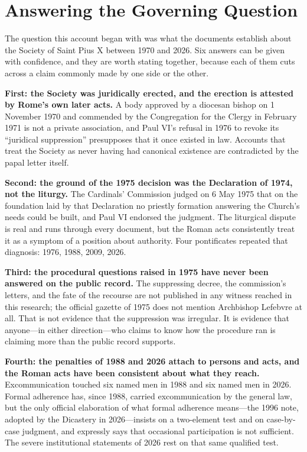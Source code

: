 \section{Answering the Governing Question}

The question this account began with was what the documents establish
about the Society of Saint Pius X between 1970 and 2026. Six answers can
be given with confidence, and they are worth stating together, because
each of them cuts across a claim commonly made by one side or the other.

\textbf{First: the Society was juridically erected, and the erection is
attested by Rome's own later acts.} A body approved by a diocesan bishop
on 1 November 1970 and commended by the Congregation for the Clergy in
February 1971 is not a private association, and Paul VI's refusal in 1976
to revoke its ``juridical suppression'' presupposes that it once existed
in law. Accounts that treat the Society as never having had canonical
existence are contradicted by the papal letter itself.

\textbf{Second: the ground of the 1975 decision was the Declaration of
1974, not the liturgy.} The Cardinals' Commission judged on 6 May 1975
that on the foundation laid by that Declaration no priestly formation
answering the Church's needs could be built, and Paul VI endorsed the
judgment. The liturgical dispute is real and runs through every
document, but the Roman acts consistently treat it as a symptom of a
position about authority. Four pontificates repeated that diagnosis:
1976, 1988, 2009, 2026.

\textbf{Third: the procedural questions raised in 1975 have never been
answered on the public record.} The suppressing decree, the commission's
letters, and the fate of the recourse are not published in any witness
reached in this research; the official gazette of 1975 does not mention
Archbishop Lefebvre at all. That is not evidence that the suppression was
irregular. It is evidence that anyone---in either direction---who claims
to know how the procedure ran is claiming more than the public record
supports.

\textbf{Fourth: the penalties of 1988 and 2026 attach to persons and
acts, and the Roman acts have been consistent about what they reach.}
Excommunication touched six named men in 1988 and six named men in 2026.
Formal adherence has, since 1988, carried excommunication by the general
law, but the only official elaboration of what formal adherence
means---the 1996 note, adopted by the Dicastery in 2026---insists on a two-element
test and on case-by-case judgment, and expressly says that occasional
participation is not sufficient. The severe institutional statements of
2026 rest on that same qualified test.

